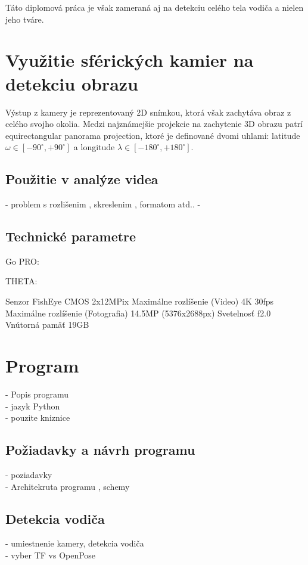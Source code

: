 \documentclass[slovak,master,dept460,male,cpp,cpdeclaration]{diploma}
\begin{document}
 Táto diplomová práca je však zameraná aj na detekciu celého tela vodiča a nielen jeho tváre. 







\newpage
\section{Využitie sférických kamier na detekciu obrazu}
\label{sec:Spherical cameras}

Výstup z kamery je reprezentovaný 2D snímkou, ktorá však zachytáva obraz z celého svojho okolia. Medzi najznámejšie projekcie na zachytenie 3D obrazu patrí equirectangular panorama projection, ktoré je definované dvomi uhlami: latitude  $ \omega \in [-90^\circ , +90^\circ ]$ a longitude $\lambda \in [-180^\circ , +180^\circ ]. $

\newpage
\subsection{Použitie v analýze videa}
- problem s rozlišenim , skreslenim , formatom atd.. 
- 


\subsection{Technické parametre}
Go PRO:

THETA:

Senzor	FishEye CMOS 2x12MPix
Maximálne rozlíšenie (Video)	4K  30fps
Maximálne rozlíšenie (Fotografia)	14.5MP (5376x2688px)
Svetelnosť	f2.0
Vnútorná pamäť	19GB

\newpage
\section{Program}
\label{sec:Program}
- Popis programu\\
- jazyk Python\\
- pouzite kniznice\\


\newpage
\subsection{Požiadavky a návrh programu}
- poziadavky \\
- Architekruta programu , schemy


\newpage
\subsection{Detekcia vodiča}
- umiestnenie kamery, detekcia vodiča\\
 - vyber TF vs OpenPose
\end{document}
